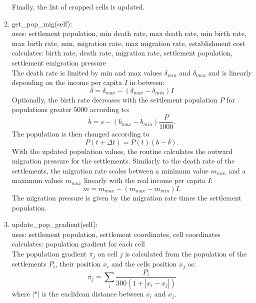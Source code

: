 \begin{enumerate}
		Finally, the list of cropped cells is updated.
	\item get_pop_mig(self):\\
		uses: settlement population, min death rate, max death rate, min birth rate, max birth rate, min, migration rate, max migration rate, establishment cost \\
		calculates: birth rate, death rate, migration rate, settlement population, settlement emigration pressure \\
		The death rate is limited by min and max values $\delta_{min}$ and $\delta_{max}$ and is linearly depending on the income per capita $I$ in between:
		\begin{equation}
			\delta = \delta_{max} - (\delta_{max} - \delta_{min})I
			\label{deat_rate}
		\end{equation}
		Optionally, the birth rate decreases with the settlement population $P$ for populations greater 5000 according to:
		\begin{equation}
			b = s - (b_{max} - b_{min}) \frac{P}{1000}.
			\label{birth_rate}
		\end{equation}
		The population is then changed according to 
		\begin{equation}
			P(t+\Delta t) = P(t) (b - \delta).
			\label{population_growth}
		\end{equation}
		With the updated population values, the routine calculates the outward migration pressure for the settlements.
		Similarly to the death rate of the settlements, the migration rate scales between a minimum value $m_{min}$ and a maximum values $m_{max}$ linearly with the real income per capita $I$:
		\begin{equation}
			m = m_{max} - (m_{max} - m_{min}) I.
			\label{migration_rate}
		\end{equation}
		The migration pressure is given by the migration rate times the settlement population.
	\item update_pop_gradient(self):\\
		uses: settlement population, settlement coordinates, cell coordinates\\
		calculates: population gradient for each cell \\
		The population gradient $\pi_j$ on cell $j$ is calculated from the population of the settlements $P_i$, their position $x_i$ and the cells position $x_j$ as:
		\begin{equation}
			\pi_j = \sum_i \frac{P_i}{300(1 + |x_i - x_j|)}
			\label{population_gradient}
		\end{equation}
		where $|*|$ is the euclidean distance between $x_i$ and $x_j$.
		

\end{enumerate}
